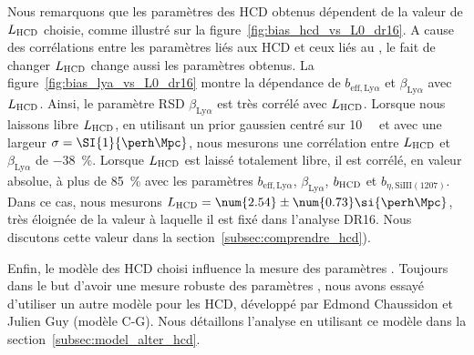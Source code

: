 Nous remarquons que les paramètres des HCD obtenus dépendent de la valeur de $L_{\textsc{HCD}}$ choisie, comme illustré sur la figure~\ref{fig:bias_hcd_vs_L0_dr16}.
A cause des corrélations entre les paramètres liés aux HCD et ceux liés au \lya{}, le fait de changer $L_{\textsc{HCD}}$ change aussi les paramètres \lya{} obtenus.
La figure~\ref{fig:bias_lya_vs_L0_dr16} montre la dépendance de $b_{\mathrm{eff},\mathrm{Ly}\alpha}$ et $\beta_{\mathrm{Ly}\alpha}$ avec $L_{\textsc{HCD}}$. Ainsi, le paramètre RSD $\beta_{\mathrm{Ly}\alpha}$ est très corrélé avec $L_{\textsc{HCD}}$. Lorsque nous laissons libre $L_{\textsc{HCD}}$, en utilisant un prior gaussien centré sur \SI{10}{\perh\Mpc} et avec une largeur $\sigma = \SI{1}{\perh\Mpc}$, nous mesurons une corrélation entre $L_{\textsc{HCD}}$ et $\beta_{\mathrm{Ly}\alpha}$ de \SI{-38}{\percent}.
Lorsque $L_{\textsc{HCD}}$ est laissé totalement libre, il est corrélé, en valeur absolue, à plus de \SI{85}{\percent} avec les paramètres $b_{\mathrm{eff},\mathrm{Ly}\alpha}$, $\beta_{\mathrm{Ly}\alpha}$, $b_{\textsc{HCD}}$ et $b_{\eta, \mathrm{SiIII}(1207)}$. Dans ce cas, nous mesurons $L_{\textsc{HCD}} = \num{2.54} \pm \num{0.73} \si{\perh\Mpc}$, très éloignée de la valeur à laquelle il est fixé dans l'analyse DR16. Nous discutons cette valeur dans la section~\ref{subsec:comprendre_hcd}).

Enfin, le modèle des HCD choisi influence la mesure des paramètres \lya{}. Toujours dans le but d'avoir une mesure robuste des paramètres \lya{}, nous avons essayé d'utiliser un autre modèle pour les HCD, développé par Edmond Chaussidon et Julien Guy (modèle C-G). Nous détaillons l'analyse en utilisant ce modèle dans la section~\ref{subsec:model_alter_hcd}.

